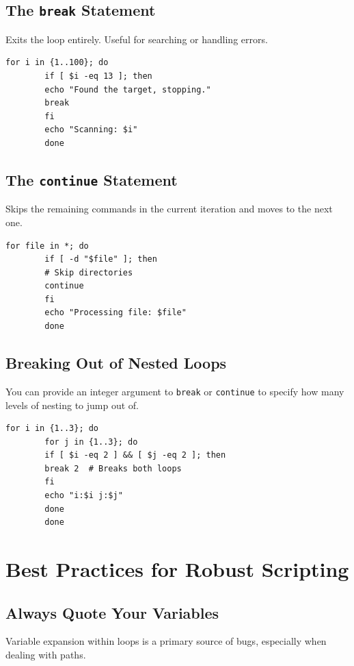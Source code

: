 \documentclass[12pt,a4paper]{article}
\begin{document}
	\subsection{The \texttt{break} Statement}
	Exits the loop entirely. Useful for searching or handling errors.
	
	\begin{lstlisting}[caption=Using break to exit early]
		for i in {1..100}; do
		if [ $i -eq 13 ]; then
		echo "Found the target, stopping."
		break
		fi
		echo "Scanning: $i"
		done
	\end{lstlisting}
	
	\subsection{The \texttt{continue} Statement}
	Skips the remaining commands in the current iteration and moves to the next one.
	
	\begin{lstlisting}[caption=Using continue to skip items]
		for file in *; do
		if [ -d "$file" ]; then
		# Skip directories
		continue
		fi
		echo "Processing file: $file"
		done
	\end{lstlisting}
	
	\subsection{Breaking Out of Nested Loops}
	You can provide an integer argument to \texttt{break} or \texttt{continue} to specify how many levels of nesting to jump out of.
	
	\begin{lstlisting}[caption=Breaking nested loops]
		for i in {1..3}; do
		for j in {1..3}; do
		if [ $i -eq 2 ] && [ $j -eq 2 ]; then
		break 2  # Breaks both loops
		fi
		echo "i:$i j:$j"
		done
		done
	\end{lstlisting}
	
	\newpage
	\section{Best Practices for Robust Scripting}
	
	\subsection{Always Quote Your Variables}
	Variable expansion within loops is a primary source of bugs, especially when dealing with paths.
	
\end{document}
